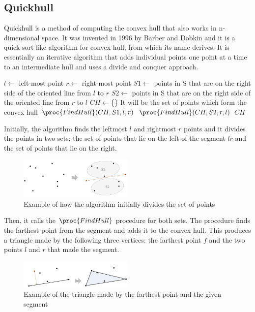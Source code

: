 \documentclass{article}
\begin{document}
\newpage
\subsection{Quickhull}

Quickhull is a method of computing the convex hull that also works in n-dimensional space. It was invented in 1996 by Barber and Dobkin and it is a quick-sort like algorithm for convex hull, from which its name derives. It is essentially an iterative algorithm that adds individual points one point at a
time to an intermediate hull and uses a divide and conquer approach.

\begin{codebox}
\li $l \gets $ left-most point
\li $r \gets $ right-most point
\li $S1 \gets $ points in S that are on the right side of the oriented line from $l$ to $r$
\li $S2 \gets $ points in S that are on the right side of the oriented line from $r$ to $l$
\li $CH \gets $\{\} \Comment It will be the set of points which form the convex hull
\li 
\li $\proc{FindHull}(CH, S1, l, r)$
\li $\proc{FindHull}(CH, S2, r, l)$
\li
\li \Return $CH$
\end{codebox}

Initially, the algorithm finds the leftmost $l$ and rightmost $r$ points and it divides the points in two sets: the set of points that lie on the left of the segment $lr$ and the set of points that lie on the right.

\begin{figure}[h]
\centering
\includegraphics[width=0.5\textwidth]{quickhull/quickhull_visual_start.png}
\caption{\label{fig:quick_visual_start}Example of how the algorithm initially divides the set of points}
\end{figure}

Then, it calls the $\proc{FindHull}$ procedure for both sets. The procedure finds the farthest point from the segment and adds it to the convex hull. This produces a triangle made by the following three vertices: the farthest point $f$ and the two points $l$ and $r$ that made the segment.

\begin{figure}[h]
\centering
\includegraphics[width=0.5\textwidth]{quickhull/quickhull_visual_divide.png}
\caption{\label{fig:quick_visual_divide}Example of the triangle made by the farthest point and the given segment}
\end{figure}
\end{document}
